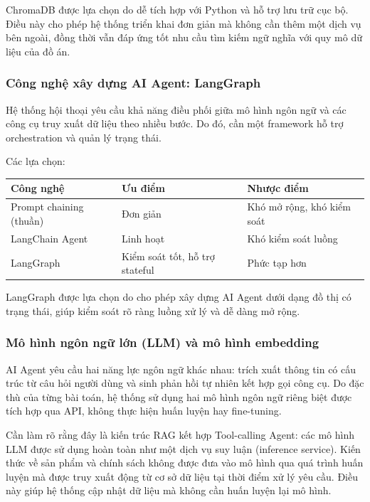 ChromaDB được lựa chọn do dễ tích hợp với Python và hỗ trợ lưu trữ cục bộ. Điều này cho phép hệ thống triển khai đơn giản mà không cần thêm một dịch vụ bên ngoài, đồng thời vẫn đáp ứng tốt nhu cầu tìm kiếm ngữ nghĩa với quy mô dữ liệu của đồ án.

\subsubsection{Công nghệ xây dựng AI Agent: LangGraph}

Hệ thống hội thoại yêu cầu khả năng điều phối giữa mô hình ngôn ngữ và các công cụ truy xuất dữ liệu theo nhiều bước. Do đó, cần một framework hỗ trợ orchestration và quản lý trạng thái.

Các lựa chọn:

\begin{tabular}{|p{3cm}|p{5cm}|p{5cm}|}
\hline
Công nghệ & Ưu điểm & Nhược điểm \\
\hline
Prompt chaining (thuần) & Đơn giản & Khó mở rộng, khó kiểm soát \\
\hline
LangChain Agent & Linh hoạt & Khó kiểm soát luồng \\
\hline
LangGraph & Kiểm soát tốt, hỗ trợ stateful & Phức tạp hơn \\
\hline
\end{tabular}

LangGraph được lựa chọn do cho phép xây dựng AI Agent dưới dạng đồ thị có trạng thái, giúp kiểm soát rõ ràng luồng xử lý và dễ dàng mở rộng.

\subsubsection{Mô hình ngôn ngữ lớn (LLM) và mô hình embedding}

AI Agent yêu cầu hai năng lực ngôn ngữ khác nhau: trích xuất thông tin có cấu trúc từ câu hỏi người dùng và sinh phản hồi tự nhiên kết hợp gọi công cụ. Do đặc thù của từng bài toán, hệ thống sử dụng hai mô hình ngôn ngữ riêng biệt được tích hợp qua API, không thực hiện huấn luyện hay fine-tuning.

Cần làm rõ rằng đây là kiến trúc RAG kết hợp Tool-calling Agent: các mô hình LLM được sử dụng hoàn toàn như một dịch vụ suy luận (inference service). Kiến thức về sản phẩm và chính sách không được đưa vào mô hình qua quá trình huấn luyện mà được truy xuất động từ cơ sở dữ liệu tại thời điểm xử lý yêu cầu. Điều này giúp hệ thống cập nhật dữ liệu mà không cần huấn luyện lại mô hình.

